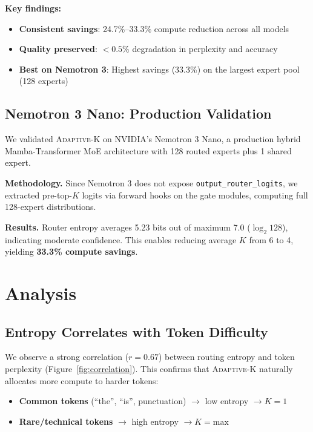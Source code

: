 \documentclass{article}
\newcommand{\adaptivek}{\textsc{Adaptive-K}}
\begin{document}
\textbf{Key findings:}
\begin{itemize}
    \item \textbf{Consistent savings}: 24.7\%--33.3\% compute reduction across all models
    \item \textbf{Quality preserved}: $<0.5\%$ degradation in perplexity and accuracy
    \item \textbf{Best on Nemotron 3}: Highest savings (33.3\%) on the largest expert pool (128 experts)
\end{itemize}

\subsection{Nemotron 3 Nano: Production Validation}

We validated \adaptivek{} on NVIDIA's Nemotron 3 Nano, a production hybrid Mamba-Transformer MoE architecture with 128 routed experts plus 1 shared expert.

\textbf{Methodology.} Since Nemotron 3 does not expose \texttt{output\_router\_logits}, we extracted pre-top-$K$ logits via forward hooks on the gate modules, computing full 128-expert distributions.

\textbf{Results.} Router entropy averages 5.23 bits out of maximum 7.0 ($\log_2 128$), indicating moderate confidence. This enables reducing average $K$ from 6 to 4, yielding \textbf{33.3\% compute savings}.

\section{Analysis}
\label{sec:analysis}

\subsection{Entropy Correlates with Token Difficulty}

We observe a strong correlation ($r = 0.67$) between routing entropy and token perplexity (Figure~\ref{fig:correlation}). This confirms that \adaptivek{} naturally allocates more compute to harder tokens:
\begin{itemize}
    \item \textbf{Common tokens} (``the'', ``is'', punctuation) $\rightarrow$ low entropy $\rightarrow K=1$
    \item \textbf{Rare/technical tokens} $\rightarrow$ high entropy $\rightarrow K=\text{max}$
\end{itemize}
\end{document}
